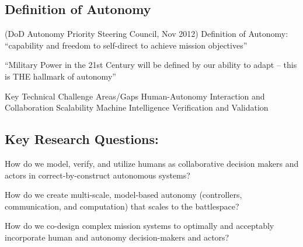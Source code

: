\subsection*{Definition of Autonomy}
(DoD Autonomy Priority Steering Council, Nov 2012)
Definition of Autonomy: “capability and freedom to self-direct to achieve mission objectives”

“Military Power in the 21st Century will be defined by our ability to adapt – this is THE hallmark of autonomy”

Key Technical Challenge Areas/Gaps
Human-Autonomy Interaction and Collaboration
Scalability
Machine Intelligence
Verification and Validation

\subsection*{Key Research Questions:}

How do we model, verify, and utilize humans as collaborative decision makers and actors in correct-by-construct autonomous systems?

How do we create multi-scale, model-based autonomy (controllers, communication, and computation) that scales to the battlespace?

How do we co-design complex mission systems to optimally and acceptably incorporate human and autonomy decision-makers and actors?


